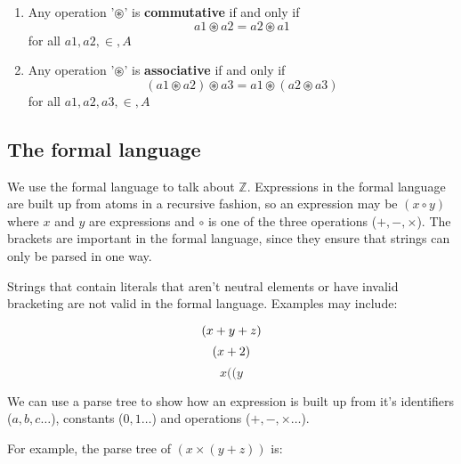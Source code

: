 \begin{enumerate}
  \item 
    Any operation '$\circledast$' is {\bf commutative} if and only if
    \begin{dmath*}
	a1 \circledast a2 = a2 \circledast a1
    \end{dmath*} 
    for all $a1,a2,\in,A$
  \item 
    Any operation '$\circledast$' is {\bf associative} if and only if
    \begin{dmath*}
	(a1 \circledast a2) \circledast a3 = a1 \circledast (a2 \circledast a3)
    \end{dmath*} 
    for all $a1,a2,a3,\in,A$
\end{enumerate}


\subsection{The formal language}

We use the formal language to talk about $\mathbb{Z}$. Expressions in the formal
language are built up from atoms in a recursive fashion, so an expression may be
$(x \circ y)$ where $x$ and $y$ are expressions and $\circ$ is one of the three
operations ($+, -, \times$). The brackets are important in the formal language,
since they ensure that strings can only be parsed in one way.

Strings that contain literals that aren't neutral elements or have invalid
bracketing are not valid in the formal language. Examples may include:

\begin{dmath*}
	(x + y + z)\\
\end{dmath*}
\begin{dmath*}
	(x + 2)\\
\end{dmath*}
\begin{dmath*}
	x((y
\end{dmath*}

We can use a parse tree to show how an expression is built up from it's
identifiers ($a, b, c\ldots$), constants ($0, 1\ldots$) and operations ($+, -,
\times\ldots$).

For example, the parse tree of $(x \times (y + z))$ is:

